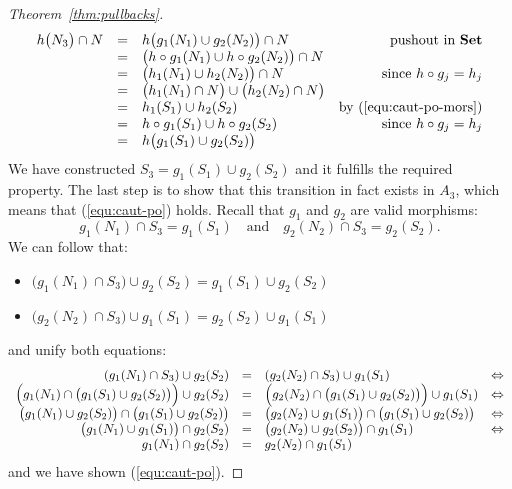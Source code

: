 \documentclass[copyright,creativecommons]{eptcs}
\newcommand{\Set}{\ensuremath{\mathbf{Set}}}
\begin{document}
\begin{proof}[Theorem~\ref{thm:pullbacks}]
\[\begin{array}{rclr}
	 h\bigl(N_3\bigr) \cap N & = & h\bigl(g_1(N_1) \cup g_2(N_2)\bigr) \cap N 	& \hspace{1cm} \mbox{pushout in \Set} \\
			& = & \bigl(h\circ g_1(N_1) \cup h\circ g_2(N_2)\bigr) \cap N \\
			& = & \bigl(h_1(N_1) \cup h_2(N_2)\bigr) \cap N 					& \mbox{since } h\circ g_j = h_j \\
			& = & \bigl(h_1(N_1) \cap N\bigr) \cup \bigl(h_2(N_2) \cap N\bigr)  \\
			& = & h_1(S_1) \cup h_2(S_2) 										& \mbox{by (\ref{equ:caut-po-mors})} \\
			& = & h\circ g_1(S_1) \cup h\circ g_2(S_2) 							& \mbox{since } h\circ g_j = h_j \\
		 	& = & h\bigl(g_1(S_1) \cup g_2(S_2)\bigr) \\
\end{array}
\]
We have constructed $S_3 = g_1(S_1) \cup g_2(S_2)$ and it fulfills the required property.
The last step is to show that this transition in fact exists in $A_3$, which means that 
(\ref{equ:caut-po}) holds. Recall that $g_1$ and $g_2$ are valid morphisms:
\[
	g_1(N_1) \cap S_3 = g_1(S_1) 
	\quad \mbox{and} \quad	 
	g_2(N_2) \cap S_3 = g_2(S_2).
\]
We can follow that:
\begin{itemize}
\item $\bigl(g_1(N_1) \cap S_3\bigr) \cup g_2(S_2) = g_1(S_1) \cup g_2(S_2)$
\item $\bigl(g_2(N_2) \cap S_3\bigr) \cup g_1(S_1) = g_2(S_2) \cup g_1(S_1)$
\end{itemize}
and unify both equations:
\[
\begin{array}{rclr}
	(g_1(N_1) \cap S_3) \cup g_2(S_2) 											& = & (g_2(N_2) \cap S_3) \cup g_1(S_1) & \Leftrightarrow \\
	\Bigr(g_1(N_1) \cap \bigl(g_1(S_1) \cup g_2(S_2)\bigr)\Bigr) \cup g_2(S_2)	& = & \Bigl(g_2(N_2) \cap \bigl(g_1(S_1) \cup g_2(S_2)\bigr)\Bigr) \cup g_1(S_1) & \Leftrightarrow \\
	\bigl(g_1(N_1) \cup g_2(S_2)\bigr) \cap \bigl(g_1(S_1) \cup g_2(S_2)\bigr)	& = & \bigl(g_2(N_2)\cup g_1(S_1)\bigr) \cap \bigl(g_1(S_1) \cup g_2(S_2)\bigr) & \Leftrightarrow \\
	\bigl(g_1(N_1) \cup g_1(S_1)\bigr) \cap g_2(S_2)							& = & \bigl(g_2(N_2)\cup g_2(S_2)\bigr) \cap g_1(S_1) & \Leftrightarrow \\
	g_1(N_1) \cap g_2(S_2)														& = & g_2(N_2) \cap g_1(S_1) \\
\end{array}
\]
and we have shown (\ref{equ:caut-po}).
\end{proof}
 
\end{document}
